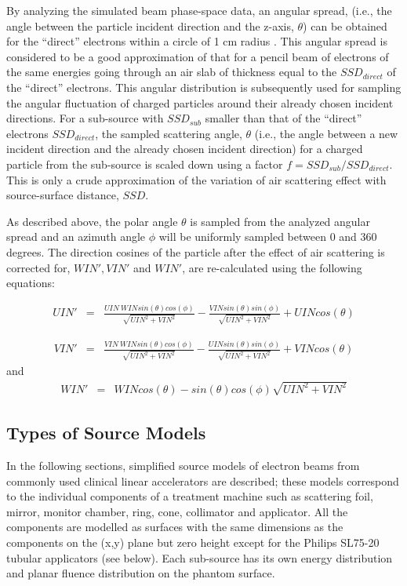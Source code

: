 \documentclass[12pt,twoside]{article}
\begin{document}
By analyzing the simulated beam phase-space data, an angular spread,
(i.e., the angle between the particle incident direction and the z-axis,
$\theta$)
can be obtained for the ``direct'' electrons within a circle of 1 cm radius
. This angular spread is considered to be a good approximation of that for a pencil beam of electrons of the same energies going through an air slab of thickness equal to the $SSD_{direct}$ of the ``direct'' electrons. This angular
distribution is subsequently used for sampling the angular fluctuation of charged particles around their already chosen incident directions. For a sub-source with $SSD_{sub}$ smaller than that of the ``direct'' electrons $SSD_{direct}$, the sampled scattering angle, $\theta$ (i.e., the angle between
a new incident direction and the already chosen incident direction) for a charged particle from the sub-source is scaled down using a factor $f = SSD_{sub}/SSD_{direct}$. This is only a crude approximation of the variation of air scattering effect with source-surface distance, $SSD$.

As described above, the polar angle $\theta$ is sampled from the analyzed angular spread and an azimuth angle $\phi$ will be uniformly sampled between 0 and 360 degrees. The direction cosines of the particle after the effect of air scattering is corrected for, $WIN', VIN'$ and $WIN'$, are re-calculated using the following equations:

\begin{eqnarray}
UIN'& =& \frac{UIN~ WIN sin(\theta) cos(\phi)}{\sqrt{UIN^2+VIN^2}} - \frac{VIN sin(\theta) sin(\phi)}{\sqrt{UIN^2+VIN^2}} + UIN cos(\theta)
\end{eqnarray}

\begin{eqnarray}
VIN'& =& \frac{VIN~WIN sin(\theta) cos(\phi)}{\sqrt{UIN^2+VIN^2}} - \frac{UIN sin(\theta) sin(\phi)}{\sqrt{UIN^2+VIN^2}} + VIN cos(\theta)
\end{eqnarray}
and
\begin{eqnarray}
WIN'& =& WIN cos(\theta) - sin(\theta) cos(\phi)\sqrt{UIN^2+VIN^2}
\end{eqnarray}


\subsection{Types of Source Models}

In the following sections, simplified source models  of electron beams
from commonly used clinical linear accelerators are described; these
models correspond to the individual components of a treatment machine such
as scattering foil, mirror, monitor chamber, ring, cone, collimator and
applicator. All the components are modelled as surfaces with the same
dimensions as the components on the (x,y) plane but zero height except for
the Philips SL75-20 tubular applicators (see below). Each sub-source has
its own energy distribution and planar fluence distribution on the phantom
surface.
\end{document}
